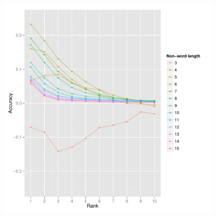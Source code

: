\begin{frame}
\begin{figure}

\end{figure}
\end{frame}

\begin{frame}
\begin{figure}
\includegraphics[height=\textheight]{figures/chapter04/ranks-by-length-difference}
\end{figure}
\end{frame}

\begin{frame}
\begin{figure}
\small

\end{figure}
\end{frame}

%
